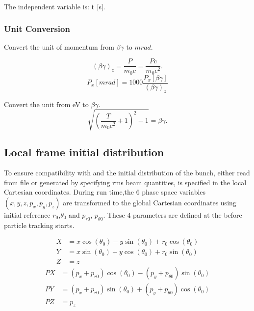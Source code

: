 The independent variable is: \textbf{t} [s].


\subsubsection{Unit Conversion}
Convert the unit of momentum from $\beta \gamma$ to
$mrad$.

\begin{equation}
\label{eq:betagamma1}
(\beta\gamma)_z=\frac{P}{m_0c}=\frac{Pc}{m_0c^2}.
\end{equation}
\begin{equation}
\label{eq:betagamma2} P_x[
mrad]=1000\frac{P_x[\beta\gamma]}{(\beta\gamma)_z}
\end{equation}

Convert the unit from eV to $\beta\gamma$.
\begin{equation}
\label{eq:eVtobetagamma}
\sqrt{(\frac{T}{m_0c^2}+1)^2-1}=\beta\gamma.
\end{equation}




\subsection{Local frame initial distribution}
\label{sec:opalcycl:localframe}
To ensure compatibility with \opalt and \opalmap 
the initial distribution of the bunch,
either read from file or generated by specifying rms beam quantities,
is specified in the local Cartesian coordinates.
During run time,the 6 phase space variables \((x, y, z, p_x, p_y, p_z)\) 
are transformed to the global Cartesian coordinates
using initial reference $r_0$,$\theta_0$ and $p_{r0}$, $p_{\theta 0}$.
These 4 parameters are defined at the 
before particle tracking starts. 

\begin{align*}  
X &= x\cos(\theta_0) - y\sin(\theta_0) + r_0\cos(\theta_0)  \\
Y &= x\sin(\theta_0) + y\cos(\theta_0) + r_0\sin(\theta_0)  \\
Z &= z 
\end{align*}
\begin{align*}  
PX &= (p_x+p_{r0})\cos(\theta_0) - (p_y+p_{\theta 0})\sin(\theta_0) \\
PY &= (p_x+p_{r0})\sin(\theta_0) + (p_y+p_{\theta 0})\cos(\theta_0) \\
PZ &= p_z 
\end{align*}    


